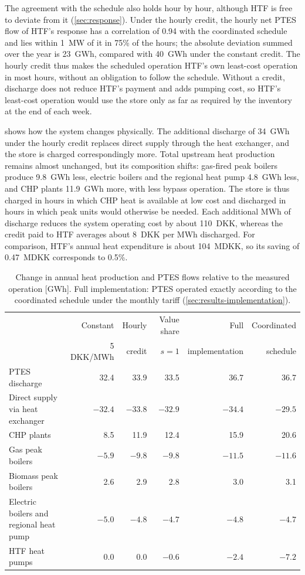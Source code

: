 The agreement with the schedule also holds hour by hour, although HTF is free to deviate from it (\cref{sec:response}). Under the hourly credit, the hourly net PTES flow of HTF's response has a correlation of 0.94 with the coordinated schedule and lies within 1~MW of it in 75\% of the hours; the absolute deviation summed over the year is 23~GWh, compared with 40~GWh under the constant credit. The hourly credit thus makes the scheduled operation HTF's own least-cost operation in most hours, without an obligation to follow the schedule. Without a credit, discharge does not reduce HTF's payment and adds pumping cost, so HTF's least-cost operation would use the store only as far as required by the inventory at the end of each week.

 shows how the system changes physically. The additional discharge of 34~GWh under the hourly credit replaces direct supply through the heat exchanger, and the store is charged correspondingly more. Total upstream heat production remains almost unchanged, but its composition shifts: gas-fired peak boilers produce 9.8~GWh less, electric boilers and the regional heat pump 4.8~GWh less, and CHP plants 11.9~GWh more, with less bypass operation. The store is thus charged in hours in which CHP heat is available at low cost and discharged in hours in which peak units would otherwise be needed. Each additional MWh of discharge reduces the system operating cost by about 110~DKK, whereas the credit paid to HTF averages about 8~DKK per MWh discharged. For comparison, HTF's annual heat expenditure is about 104~MDKK, so its saving of 0.47~MDKK corresponds to 0.5\%.

\begin{table}[!htb]
    \centering
    \small
    \caption{Change in annual heat production and PTES flows relative to the measured operation [GWh]. Full implementation: PTES operated exactly according to the coordinated schedule under the monthly tariff (\cref{sec:results-implementation}).}
    \label{tab:production}
    \begin{tabular}{lrrrrr}
        \toprule
        & Constant & Hourly & Value share & Full & Coordinated \\
        & 5 DKK/MWh & credit & $s=1$ & implementation & schedule \\
        \midrule
        PTES discharge & 32.4 & 33.9 & 33.5 & 36.7 & 36.7 \\
        Direct supply via heat exchanger & $-32.4$ & $-33.8$ & $-32.9$ & $-34.4$ & $-29.5$ \\
        CHP plants & 8.5 & 11.9 & 12.4 & 15.9 & 20.6 \\
        Gas peak boilers & $-5.9$ & $-9.8$ & $-9.8$ & $-11.5$ & $-11.6$ \\
        Biomass peak boilers & 2.6 & 2.9 & 2.8 & 3.0 & 3.1 \\
        Electric boilers and regional heat pump & $-5.0$ & $-4.8$ & $-4.7$ & $-4.8$ & $-4.7$ \\
        HTF heat pumps & 0.0 & 0.0 & $-0.6$ & $-2.4$ & $-7.2$ \\
        \bottomrule
    \end{tabular}
\end{table}

